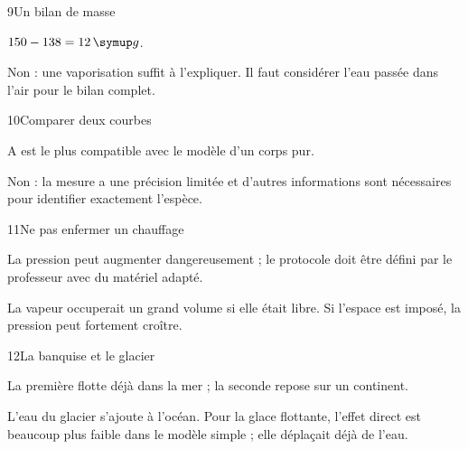 \par\noindent\begin{minipage}{\linewidth}
\begin{corrige}{9}{Un bilan de masse}
\begin{questions}
\item $150-138=12\unite g$.
\item Non : une vaporisation suffit à l’expliquer. Il faut considérer l’eau passée dans l’air pour le bilan complet.
\end{questions}
\end{corrige}
\end{minipage}
\par\noindent\begin{minipage}{\linewidth}
\begin{corrige}{10}{Comparer deux courbes}
\begin{questions}
\item A est le plus compatible avec le modèle d’un corps pur.
\item Non : la mesure a une précision limitée et d’autres informations sont nécessaires pour identifier exactement l’espèce.
\end{questions}
\end{corrige}
\end{minipage}
\par\noindent\begin{minipage}{\linewidth}
\begin{corrige}{11}{Ne pas enfermer un chauffage}
\begin{questions}
\item La pression peut augmenter dangereusement ; le protocole doit être défini par le professeur avec du matériel adapté.
\item La vapeur occuperait un grand volume si elle était libre. Si l’espace est imposé, la pression peut fortement croître.
\end{questions}
\end{corrige}
\end{minipage}
\par\noindent\begin{minipage}{\linewidth}
\begin{corrige}{12}{La banquise et le glacier}
\begin{questions}
\item La première flotte déjà dans la mer ; la seconde repose sur un continent.
\item L’eau du glacier s’ajoute à l’océan. Pour la glace flottante, l’effet direct est beaucoup plus faible dans le modèle simple ; elle déplaçait déjà de l’eau.
\end{questions}
\end{corrige}
\end{minipage}
